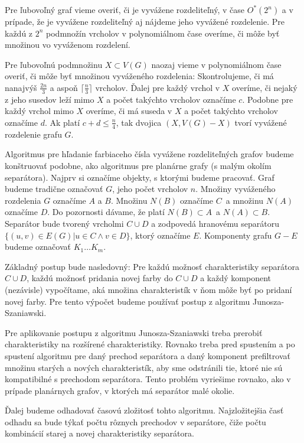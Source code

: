 Pre ľubovoľný graf vieme overiť, či je vyvážene rozdeliteľný, v čase $O^*(2^n)$ a v prípade, že je
vyvážene rozdeliteľný aj nájdeme jeho vyvážené rozdelenie. Pre každú z $2^n$ podmnožín vrcholov
v polynomiálnom čase overíme, či môže byť množinou vo vyváženom rozdelení.

Pre ľubovoľnú podmnožinu $X \subset V(G)$ naozaj vieme
v polynomiálnom čase overiť, či môže byť množinou vyváženého rozdelenia: Skontrolujeme, či má
nanajvýš $\frac{2n}{3}$ a aspoň $\lceil \frac{n}{3} \rceil$ vrcholov. Ďalej pre každý vrchol v $X$
overíme, či nejaký z jeho susedov leží mimo $X$ a počet takýchto vrcholov označíme $c$. Podobne
pre každý vrchol mimo $X$ overíme, či má suseda v $X$ a počet takýchto vrcholov označíme $d$. Ak
platí $c + d \leq \frac{n}{4}$, tak dvojica $(X, V(G) - X)$ tvorí vyvážené rozdelenie grafu $G$.

Algoritmus pre hľadanie farbiaceho čísla vyvážene rozdeliteľných grafov budeme konštruovať podobne, ako
algoritmus pre planárne grafy (s malým okolím separátora). Najprv si označíme objekty, s ktorými budeme
pracovať. Graf budeme tradične označovať $G$, jeho počet vrcholov $n$. Množiny vyváženého rozdelenia $G$
označíme $A$ a $B$. Množinu $N(B)$ označíme $C$ a množinu $N(A)$ označíme $D$. Do pozornosti dávame, že
platí $N(B) \subset A$ a $N(A) \subset B$. Separátor bude tvorený vrcholmi $C \cup D$ a zodpovedá hranovému
separátoru $\{(u,v) \in E(G) | u \in C \wedge v \in D\}$, ktorý označíme $E$. Komponenty grafu $G - E$ budeme
označovať $K_1 \ldots K_m$.

Základný postup bude nasledovný: Pre každú možnosť charakteristiky separátora $C \cup D$,
každú možnosť pridania novej farby do $C \cup D$ a každý komponent (nezávisle) vypočítame, aká
množina charakteristík v ňom môže byť po pridaní novej farby. Pre tento výpočet budeme používať
postup z algoritmu Junosza-Szaniawski.

Pre aplikovanie postupu z algoritmu Junosza-Szaniawski treba prerobiť charakteristiky na
rozšírené charakteristiky. Rovnako treba pred spustením a po spustení algoritmu pre daný
prechod separátora a daný komponent prefiltrovať množinu starých a nových charakteristík,
aby sme odstránili tie, ktoré nie sú kompatibilné s prechodom separátora. Tento problém
vyriešime rovnako, ako v prípade planárnych grafov, v ktorých má separátor malé okolie.

Ďalej budeme odhadovať časovú zložitosť tohto algoritmu. Najzložitejšia časť odhadu sa bude týkať
počtu rôznych prechodov v separátore, čiže počtu kombinácií starej a novej charakteristiky separátora.

